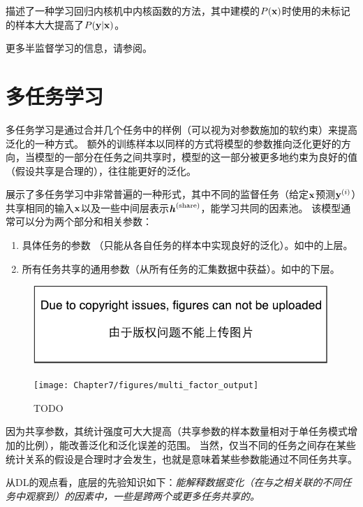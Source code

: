 \cite{Russ+Geoff-nips-2007}描述了一种学习回归内核机中内核函数的方法，其中建模的$P(\mathbf{x})$时使用的未标记的样本大大提高了$P(\mathbf{y} | \mathbf{x})$。

更多半监督学习的信息，请参阅\cite{SSL-Book-2006}。

\section{多任务学习}
\label{sec:multitask_learning}
多任务学习\citep{caruana93a}是通过合并几个任务中的样例（可以视为对参数施加的软约束）来提高泛化的一种方式。
额外的训练样本以同样的方式将模型的参数推向泛化更好的方向，当模型的一部分在任务之间共享时，模型的这一部分被更多地约束为良好的值（假设共享是合理的），往往能更好的泛化。

展示了多任务学习中非常普遍的一种形式，其中不同的监督任务（给定$\mathbf{x}$预测$\mathbf{y}^{(i)}$）共享相同的输入$\mathbf{x}$以及一些中间层表示$\boldsymbol{\mathit{h}}^{(\text{share})}$，能学习共同的因素池。
该模型通常可以分为两个部分和相关参数：
\begin{enumerate}
 \item 具体任务的参数 （只能从各自任务的样本中实现良好的泛化）。如中的上层。
 \item 所有任务共享的通用参数（从所有任务的汇集数据中获益）。如中的下层。
\end{enumerate}
\begin{figure}[!htb]
\ifOpenSource
\centerline{\includegraphics{figure.pdf}}
\else
\centerline{\texttt{[image: Chapter7/figures/multi\_factor\_output]}}
\fi
\caption{TODO}
\label{fig:chap7_multi_factor_output}
\end{figure}

因为共享参数，其统计强度可大大提高（共享参数的样本数量相对于单任务模式增加的比例），能改善泛化和泛化误差的范围\citep{baxter95a}。
当然，仅当不同的任务之间存在某些统计关系的假设是合理时才会发生，也就是意味着某些参数能通过不同任务共享。

从\gls{DL}的观点看，底层的先验知识如下：\emph{能解释数据变化（在与之相关联的不同任务中观察到）的因素中，一些是跨两个或更多任务共享的。}


